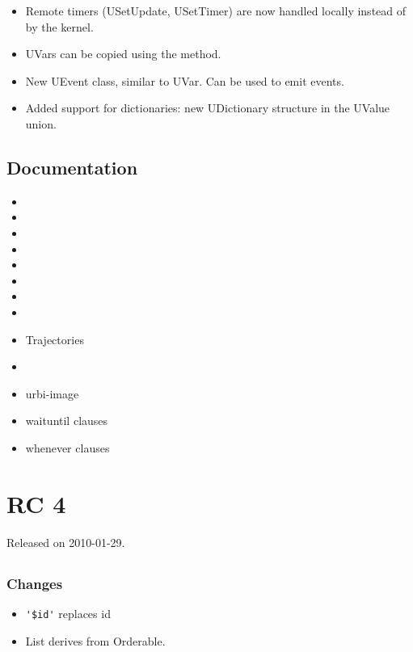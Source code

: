 \begin{itemize}
\item Remote timers (USetUpdate, USetTimer) are now handled locally
  instead of by the kernel.
\item UVars can be copied using the  method.
\item New UEvent class, similar to UVar. Can be used to emit events.
\item Added support for dictionaries: new UDictionary structure in the
  UValue union.
\end{itemize}

\subsection{Documentation}

\begin{itemize}
\item {}
\item {}
\item {}
\item {}
\item {}
\item {}
\item {}
\item {}
\item Trajectories
\item {}
\item urbi-image
\item waituntil clauses
\item whenever clauses
\end{itemize}

\section{ RC 4}
Released on 2010-01-29.

\subsection{\us}
\subsubsection{Changes}

\begin{itemize}
\item \lstinline|'$id'| replaces id
\item List derives from Orderable.
\end{itemize}

